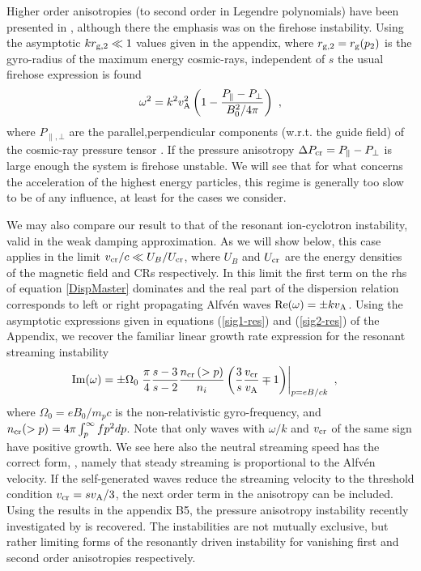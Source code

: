 \documentclass[a4paper,fleqn,usenatbib]{mnras}
\newcommand{\eqb}{\begin{eqnarray}}
\newcommand{\eqe}{\end{eqnarray}}
\begin{document}
Higher order anisotropies (to second order in Legendre polynomials) have been presented in \cite{BykovMNRAS11}, although there the emphasis was on the firehose instability. Using the asymptotic $kr_{\rm g,2}\ll1$ values given in the appendix, where $r_{\rm g,2}=r_{\rm g}(p_2)$ is the gyro-radius of the maximum energy cosmic-rays, independent of $s$ the usual firehose expression is found
\eqb
\omega^2 = k^2 v_{\rm A}^2\left( 1 -\frac{P_{\|}-P_\bot}{B_0^2/4\pi}\right)~,
\eqe
where $P_{\|,\bot}$ are the parallel,perpendicular components (w.r.t. the guide field) of the cosmic-ray pressure tensor  \citep{Bykovetal11,Scottetal}. If the pressure anisotropy $\Delta P_{\rm cr} = P_\|-P_\bot$ is large enough the system is firehose unstable. We will see that for what concerns the acceleration of the highest energy particles, this regime is generally too slow to be of any influence, at least for the cases we consider.


We may also compare our result to that of the resonant ion-cyclotron instability, valid in the weak damping approximation. As we will show below, this case applies in the limit ${v_{\rm cr}}/{c} \ll U_{B}/U_{\rm cr}$, where $U_B$ and $U_{\rm cr}$ are the energy densities of the magnetic field and CRs respectively. In this limit the first term on the rhs of equation \ref{DispMaster} dominates and the real part of the dispersion relation corresponds to left or right propagating  Alfv\'en waves ${\rm Re}({\omega})= \pm k v_{\rm A}$.
Using the asymptotic expressions given in equations (\ref{sig1-res}) and (\ref{sig2-res}) of the Appendix,
we recover the familiar linear growth rate expression for the resonant streaming instability
\begin{align}
&{ \rm Im}({\omega}) = \pm {\Omega_0} \left.\frac{\pi}{4} \frac{s-3}{s-2}
\frac{n_{\rm cr}\left(>p\right)}{n_i }\left(\frac{3}{s}\frac{v_{\rm cr}}{v_{\rm A}}\mp  1\right)\right|_{p=eB/ck} ~,\nonumber
\end{align}
where $\Omega_0= eB_0/m_p c$ is the non-relativistic gyro-frequency, and $n_{\rm cr}(>p) = 4 \pi \int_p^\infty f p^2dp$.
Note that only waves with $\omega/k$ and $v_{\rm cr}$ of the same sign have positive growth. We see here also the neutral streaming speed has the correct form, \cite[e.g.][]{MelroseWentzel70}, namely that steady streaming is proportional to the Alfv\'en velocity. If the self-generated waves reduce the streaming velocity to the threshold condition $v_{\rm cr} = s v_{\rm A}/3$, the next order term in the anisotropy can be included. Using the results in the appendix B5, the pressure anisotropy instability recently investigated by \cite{Zweibel20} is recovered. The instabilities are not mutually exclusive, but rather limiting forms of the resonantly driven instability for vanishing first and second order anisotropies respectively. 
\end{document}
